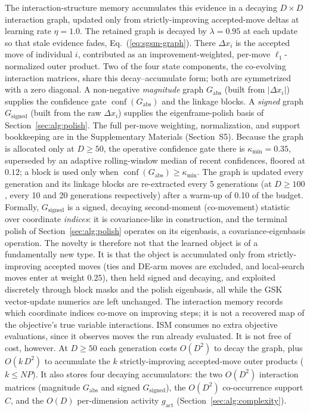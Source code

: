 The interaction-structure memory accumulates
this evidence in a decaying $D\times D$ interaction graph, updated
only from strictly-improving accepted-move deltas at learning rate $\eta=1.0$.
The retained graph is decayed by $\lambda=0.95$ at each update so that stale
evidence fades, Eq.~(\ref{eq:sgsm-graph}). There $\Delta x_i$ is the
accepted move of individual $i$, contributed as an improvement-weighted,
per-move $\ell_1$-normalized outer product. Two of the four state components, the co-evolving interaction
matrices, share this decay--accumulate form; both are symmetrized with a zero
diagonal. A non-negative \emph{magnitude} graph $G_{\mathrm{abs}}$ (built from
$|\Delta x_i|$) supplies the confidence gate $\operatorname{conf}(G_{\mathrm{abs}})$
and the linkage blocks. A \emph{signed} graph $G_{\mathrm{signed}}$
(built from the raw $\Delta x_i$) supplies the eigenframe-polish basis of
Section~\ref{sec:alg:polish}. The
full per-move weighting, normalization, and support bookkeeping are in the
Supplementary Materials (Section~S5). Because the graph is allocated only at
$D\ge50$, the operative confidence gate there is $\kappa_{\min}=0.35$,
superseded by an adaptive rolling-window median of recent confidences,
floored at $0.12$; a block is used only when
$\operatorname{conf}(G_{\mathrm{abs}})\ge\kappa_{\min}$. %
The graph is updated every generation and its linkage blocks are
re-extracted every 5 generations (at $D\ge100$, every 10 and 20
generations respectively) after a warm-up of 0.10 of the
budget. %
Formally, $G_{\mathrm{signed}}$ is a signed, decaying second-moment (co-movement)
statistic over coordinate \emph{indices}: it is covariance-like in
construction, and the terminal polish of
Section~\ref{sec:alg:polish} operates on its eigenbasis, a
covariance-eigenbasis operation. The novelty is therefore not that the
learned object is of a fundamentally new type. It is that the object is
accumulated only from strictly-improving accepted moves (ties and DE-arm
moves are excluded, and local-search moves enter at weight $0.25$), then held
signed and decaying, and exploited discretely through block masks and the polish
eigenbasis, all while the GSK vector-update numerics are left unchanged. The
interaction memory records which coordinate indices co-move on improving steps;
it is not a recovered map of the objective's true variable interactions.
ISM consumes no extra objective evaluations, since it observes moves the
run already evaluated. It is not free of cost, however. At $D \geq 50$ each
generation costs $O(D^{2})$ to decay the graph, plus $O(k\,D^{2})$ to
accumulate the $k$ strictly-improving accepted-move outer products ($k \leq NP$).
It also stores four decaying accumulators: the two $O(D^{2})$ interaction
matrices (magnitude $G_{\mathrm{abs}}$ and signed $G_{\mathrm{signed}}$), the
$O(D^{2})$ co-occurrence support $C$, and the $O(D)$ per-dimension activity
$g_{\mathrm{act}}$
(Section~\ref{sec:alg:complexity}). %

